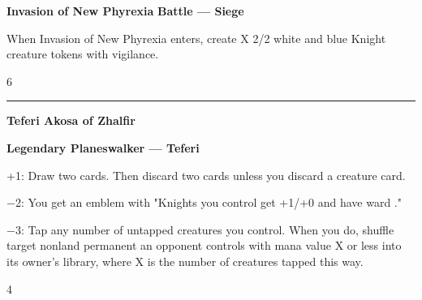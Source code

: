 \documentclass[8pt]{extarticle}
\begin{document}
{\large\textbf{Invasion of New Phyrexia}}
\hfill
\X\W\U

\textbf{Battle — Siege}

When Invasion of New Phyrexia enters, create X 2/2 white and blue Knight creature tokens with vigilance.

\hfill6

\vfill
\hrule
\vfill

{\large\textbf{Teferi Akosa of Zhalfir}}

\textbf{Legendary Planeswalker — Teferi}

+1: Draw two cards. Then discard two cards unless you discard a creature card.

−2: You get an emblem with "Knights you control get +1/+0 and have ward \1."

−3: Tap any number of untapped creatures you control. When you do, shuffle target nonland permanent an opponent controls with mana value X or less into its owner's library, where X is the number of creatures tapped this way.

\hfill4
\end{document}

